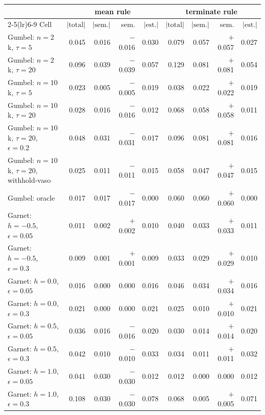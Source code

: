 \begin{tabular}{lrrrrrrrr}
\toprule
 & \multicolumn{4}{c}{mean rule} & \multicolumn{4}{c}{terminate rule} \\
\cmidrule(lr){2-5}\cmidrule(lr){6-9}
Cell & $|\mathrm{total}|$ & $|\mathrm{sem.}|$ & sem. & $|\mathrm{est.}|$ & $|\mathrm{total}|$ & $|\mathrm{sem.}|$ & sem. & $|\mathrm{est.}|$ \\
\midrule
Gumbel: $n{=}2$k, $\tau{=}5$ & 0.045 & 0.016 & $-$0.016 & 0.030 & 0.079 & 0.057 & $+$0.057 & 0.027 \\
Gumbel: $n{=}2$k, $\tau{=}20$ & 0.096 & 0.039 & $-$0.039 & 0.057 & 0.129 & 0.081 & $+$0.081 & 0.054 \\
Gumbel: $n{=}10$k, $\tau{=}5$ & 0.023 & 0.005 & $-$0.005 & 0.019 & 0.038 & 0.022 & $+$0.022 & 0.019 \\
Gumbel: $n{=}10$k, $\tau{=}20$ & 0.028 & 0.016 & $-$0.016 & 0.012 & 0.068 & 0.058 & $+$0.058 & 0.011 \\
Gumbel: $n{=}10$k, $\tau{=}20$, $\epsilon{=}0.2$ & 0.048 & 0.031 & $-$0.031 & 0.017 & 0.096 & 0.081 & $+$0.081 & 0.016 \\
Gumbel: $n{=}10$k, $\tau{=}20$, withhold-vaso & 0.025 & 0.011 & $-$0.011 & 0.015 & 0.058 & 0.047 & $+$0.047 & 0.015 \\
Gumbel: oracle & 0.017 & 0.017 & $-$0.017 & 0.000 & 0.060 & 0.060 & $+$0.060 & 0.000 \\
Garnet: $h{=}{-}0.5$, $\epsilon{=}0.05$ & 0.011 & 0.002 & $+$0.002 & 0.010 & 0.040 & 0.033 & $+$0.033 & 0.011 \\
Garnet: $h{=}{-}0.5$, $\epsilon{=}0.3$ & 0.009 & 0.001 & $+$0.001 & 0.009 & 0.033 & 0.029 & $+$0.029 & 0.010 \\
Garnet: $h{=}0.0$, $\epsilon{=}0.05$ & 0.016 & 0.000 & 0.000 & 0.016 & 0.046 & 0.034 & $+$0.034 & 0.016 \\
Garnet: $h{=}0.0$, $\epsilon{=}0.3$ & 0.021 & 0.000 & 0.000 & 0.021 & 0.025 & 0.010 & $+$0.010 & 0.021 \\
Garnet: $h{=}0.5$, $\epsilon{=}0.05$ & 0.036 & 0.016 & $-$0.016 & 0.020 & 0.030 & 0.014 & $+$0.014 & 0.020 \\
Garnet: $h{=}0.5$, $\epsilon{=}0.3$ & 0.042 & 0.010 & $-$0.010 & 0.033 & 0.034 & 0.011 & $+$0.011 & 0.032 \\
Garnet: $h{=}1.0$, $\epsilon{=}0.05$ & 0.041 & 0.030 & $-$0.030 & 0.012 & 0.012 & 0.000 & 0.000 & 0.012 \\
Garnet: $h{=}1.0$, $\epsilon{=}0.3$ & 0.108 & 0.030 & $-$0.030 & 0.078 & 0.068 & 0.005 & $+$0.005 & 0.071 \\
\bottomrule
\end{tabular}
